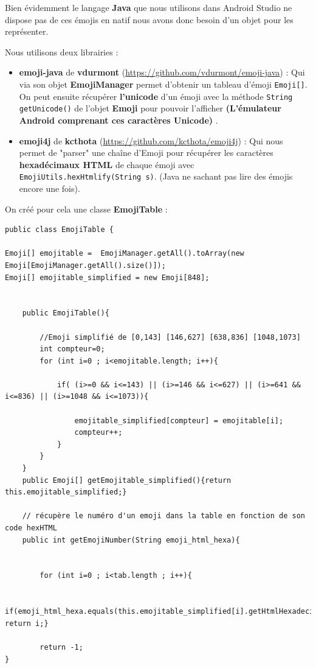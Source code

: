 \documentclass{article}
\begin{document}
Bien évidemment le langage \textbf{Java} que nous utilisons dans Android Studio ne dispose pas de ces émojis en natif nous avons donc besoin d'un objet pour les représenter.

Nous utilisons deux librairies : 
\begin{itemize}
\item \textbf{emoji-java} de \textbf{vdurmont} (\href{https://github.com/vdurmont/emoji-java}{https://github.com/vdurmont/emoji-java}) : Qui via son objet \textbf{EmojiManager} permet d'obtenir un tableau d’émoji \verb+Emoji[]+. On peut ensuite récupérer \textbf{l'unicode} d'un émoji avec la méthode \verb+String getUnicode()+ de l'objet \textbf{Emoji} pour pouvoir l'afficher \textbf{(L'émulateur Android comprenant ces caractères Unicode)} .
\item \textbf{emoji4j} de \textbf{kcthota} (\href{https://github.com/kcthota/emoji4j}{https://github.com/kcthota/emoji4j}) : Qui nous permet de "parser" une chaîne d'Emoji pour récupérer les caractères \textbf{hexadécimaux HTML} de chaque émoji avec \verb+EmojiUtils.hexHtmlify(String s)+. (Java ne sachant pas lire des émojis encore une fois).
\end{itemize}
\vspace{1\baselineskip} 


On créé pour cela une classe \textbf{EmojiTable} : 

\begin{verbatim}
public class EmojiTable {

Emoji[] emojitable =  EmojiManager.getAll().toArray(new Emoji[EmojiManager.getAll().size()]);
Emoji[] emojitable_simplified = new Emoji[848];


    public EmojiTable(){

        //Emoji simplifié de [0,143] [146,627] [638,836] [1048,1073]
        int compteur=0;
        for (int i=0 ; i<emojitable.length; i++){

            if( (i>=0 && i<=143) || (i>=146 && i<=627) || (i>=641 && i<=836) || (i>=1048 && i<=1073)){

                emojitable_simplified[compteur] = emojitable[i];
                compteur++;
            }
        }
    }
    public Emoji[] getEmojitable_simplified(){return  this.emojitable_simplified;}

	// récupère le numéro d'un emoji dans la table en fonction de son code hexHTML
    public int getEmojiNumber(String emoji_html_hexa){


        for (int i=0 ; i<tab.length ; i++){

            if(emoji_html_hexa.equals(this.emojitable_simplified[i].getHtmlHexadecimal())) return i;}

        return -1;
}
\end{verbatim}
\end{document}
